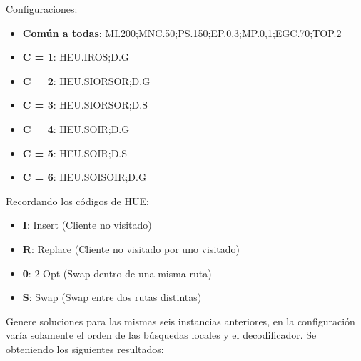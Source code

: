 \bigskip

Configuraciones: 
\begin{itemize}
  \item \textbf{Común a todas}: MI.200;MNC.50;PS.150;EP.0,3;MP.0,1;EGC.70;TOP.2
  \item \textbf{C = 1}: HEU.IROS;D.G
  \item \textbf{C = 2}: HEU.SIORSOR;D.G
  \item \textbf{C = 3}: HEU.SIORSOR;D.S
  \item \textbf{C = 4}: HEU.SOIR;D.G
  \item \textbf{C = 5}: HEU.SOIR;D.S
  \item \textbf{C = 6}: HEU.SOISOIR;D.G
\end{itemize}

Recordando los códigos de HUE: 
\begin{itemize}
  \item \textbf{I}: Insert (Cliente no visitado)
  \item \textbf{R}: Replace (Cliente no visitado por uno visitado)
  \item \textbf{0}: 2-Opt (Swap dentro de una misma ruta)
  \item \textbf{S}: Swap (Swap entre dos rutas distintas)
\end{itemize}

\bigskip

Genere soluciones para las mismas seis instancias anteriores, en la configuración varía solamente el orden de las búsquedas locales y el decodificador. Se obteniendo los siguientes resultados:

\bigskip

